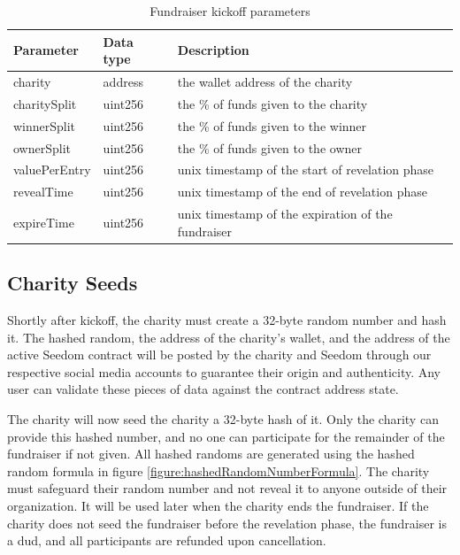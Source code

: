 \documentclass[11pt]{article}
\begin{document}
\begin{table}[H]
\begin{center}
\begin{tabular}{| l | l | l |}
\hline
\textbf{Parameter} & \textbf{Data type} & \textbf{Description} \\ \hline
charity & address & the wallet address of the charity \\ \hline
charitySplit & uint256 & the \% of funds given to the charity \\ \hline
winnerSplit & uint256 & the \% of funds given to the winner \\ \hline
ownerSplit & uint256 & the \% of funds given to the owner \\ \hline
valuePerEntry & uint256 & unix timestamp of the start of revelation phase \\ \hline
revealTime & uint256 & unix timestamp of the end of revelation phase \\ \hline
expireTime & uint256 & unix timestamp of the expiration of the fundraiser \\ \hline
\end{tabular}
\caption{Fundraiser kickoff parameters}
\label{tab:fundraiserKickoffParameters}
\end{center}
\end{table}

\subsection{Charity Seeds}
Shortly after kickoff, the charity must create a 32-byte random number and hash it. The hashed random, the address of the charity's wallet, and the address of the active Seedom contract will be posted by the charity and Seedom through our respective social media accounts to guarantee their origin and authenticity. Any user can validate these pieces of data against the contract address state.

The charity will now seed the charity a 32-byte hash of it. Only the charity can provide this hashed number, and no one can participate for the remainder of the fundraiser if not given. All hashed randoms are generated using the hashed random formula in figure \ref{figure:hashedRandomNumberFormula}. The charity must safeguard their random number and not reveal it to anyone outside of their organization. It will be used later when the charity ends the fundraiser. If the charity does not seed the fundraiser before the revelation phase, the fundraiser is a dud, and all participants are refunded upon cancellation.
\end{document}
